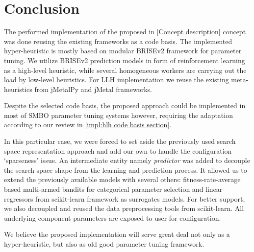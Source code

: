 \section{Conclusion}
The performed implementation of the proposed in \cref{Concept description} concept was done reusing the existing frameworks as a code basis. The implemented hyper-heuristic is mostly based on modular BRISEv2 framework for parameter tuning. We utilize BRISEv2 prediction models in form of reinforcement learning as a high-level heuristic, while several homogeneous workers are carrying out the load by low-level heuristics. For LLH implementation we reuse the existing meta-heuristics from jMetalPy and jMetal frameworks.

Despite the selected code basis, the proposed approach could be implemented in most of SMBO parameter tuning systems however, requiring the adaptation according to our review in \cref{impl:hlh code basis section}.

In this particular case, we were forced to set aside the previously used search space representation approach and add our own to handle the configuration `sparseness' issue. An intermediate entity namely \emph{predictor} was added to decouple the search space shape from the learning and prediction process. It allowed us to extend the previously available models with several others: fitness-rate-average based multi-armed bandits for categorical parameter selection and linear regressors from scikit-learn framework as surrogates models. For better support, we also decoupled and reused the data preprocessing tools from scikit-learn. All underlying component parameters are exposed to user for configuration.

We believe the proposed implementation will serve great deal not only as a hyper-heuristic, but also as old good parameter tuning framework.
